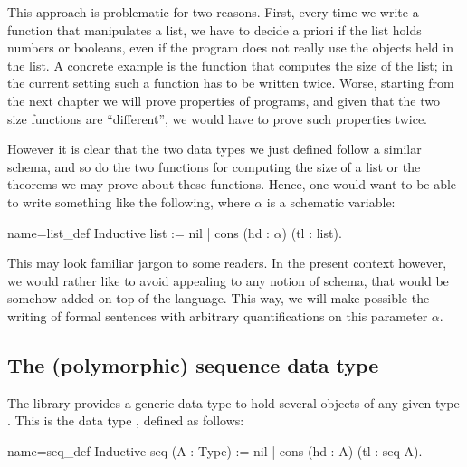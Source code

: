 This approach is problematic for two reasons.  First, every time we
write a function that manipulates a list, we have to decide a priori
if the list holds numbers or booleans, even if the program does not
really use the objects held in the list.
A concrete example is the function that computes the size of the list;
in the current setting such a function has to be written twice.
Worse, starting from the next chapter we will prove properties of programs,
and given that the two size functions are ``different'', we would have
to prove such properties twice.

However it is clear that the two data types we just defined follow
a similar schema, and so do the two functions for computing the size of
a list
or the theorems we may prove about these functions.  Hence, one would
want to be able to write something
like the following, where $\alpha$ is a schematic variable:

\begin{coq}{name=list_def}{}
Inductive list := nil | cons (hd : $\alpha$) (tl : list).
\end{coq}

\noindent This may look familiar jargon to some readers. In the
present context however, we would rather like to avoid appealing to
any notion of schema, that would be somehow added on top of the
\Coq{} language. This way, we will make possible the writing of
formal sentences with arbitrary quantifications on this parameter
$\alpha$.

%

\subsection{The (polymorphic) sequence data type}

The \mcbMC{} library provides a generic data type to hold
several objects of any given type . This is the data type ,
defined as follows:

\begin{coq}{name=seq_def}{}
Inductive seq (A : Type) := nil | cons (hd : A) (tl : seq A).
\end{coq}


